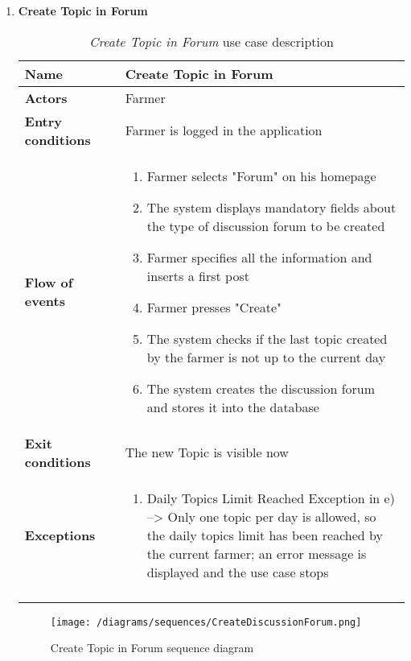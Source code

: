 \begin{enumerate}
				\FloatBarrier
				\newpage
			\item \textbf{Create Topic in Forum}
				\begin{longtable}{p{0.26\linewidth}p{0.75\linewidth}}
					\toprule
					\textbf{Name} & \textbf{Create Topic in Forum} \\
					\midrule
					\textbf{Actors} & Farmer\\
					\midrule
					\textbf{Entry conditions} & Farmer is logged in the application \\
					\midrule
					\textbf{Flow of events} & 
					\begin{enumerate}
						\item Farmer selects "Forum" on his homepage
						\item The system displays mandatory fields about the type of discussion forum to be created
						\item Farmer specifies all the information and inserts a first post
						\item Farmer presses "Create"
						\item The system checks if the last topic created by the farmer is not up to the current day
						\item The system creates the discussion forum and stores it into the database
					\end{enumerate} \\
					\midrule
					\textbf{Exit conditions} & The new Topic is visible now\\
					\midrule
					\textbf{Exceptions} &  
					\begin{enumerate}
						\item Daily Topics Limit Reached Exception in e) --> Only one topic per day is allowed, so the daily topics limit has been reached by the current farmer; an error message is displayed and the use case stops
					\end{enumerate}\\
					\bottomrule
					\caption{\emph{Create Topic in Forum} use case description}
				\end{longtable}
	
				\begin{figure}[hbtp]
					\centering
					\texttt{[image: /diagrams/sequences/CreateDiscussionForum.png]}
					\caption{Create Topic in Forum sequence diagram}
				\end{figure}
			
				\FloatBarrier
				\newpage
		

\end{enumerate}
